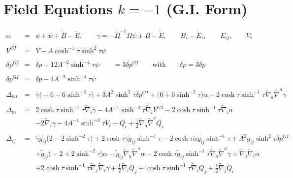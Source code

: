 \documentclass[10pt,letterpaper]{article}
\numberwithin{equation}{section}
\begin{document}
\section{Field Equations $k=-1$ (G.I. Form)}
\begin{eqnarray}
\alpha  &=& \phi + \psi + \dot B - \ddot E,\qquad \gamma = - \dot\Omega^{-1}\Omega \psi + B - \dot E,
\qquad B_i - \dot E_i,\qquad E_{ij},\qquad V_i
\\ \nonumber\\
V^{GI} &=& V -  A\cosh^{-1}\tau \sinh^2\tau \psi 
\\ \nonumber\\
\delta \rho^{GI}&=&\delta \rho - 12 A^{-2} \sinh^{-4}\tau \psi \qquad= 3\delta p^{GI}\qquad \text{with}\qquad \delta\rho=3\delta p
\\ \nonumber\\ 
\delta p^{GI}&=&\delta p  - 4 A^{-2}\sinh^{-4}\tau \psi 
\\ \nonumber\\
\Delta_{00}&=& \dot{\gamma} \bigl(-6 - 6 \sinh^{-2}\tau\bigr) + 3 A^2 \sinh^2\tau \delta p^{GI}{} + \bigl(6 + 6 \sinh^{-2}\tau\bigr) \alpha + 2 \cosh\tau \sinh^{-1}\tau \tilde{\nabla}_{a}\tilde{\nabla}^{a}\gamma 
\\  \nonumber\\ 
\Delta_{0i}&=& 2 \cosh\tau \sinh^{-1}\tau \tilde{\nabla}_{i}\dot{\gamma} - 4 A^{-1} \sinh^{-3}\tau \tilde{\nabla}_{i}V^{GI}{} - 2 \cosh\tau \sinh^{-1}\tau \tilde{\nabla}_{i}\alpha \nonumber \\ 
&& - 2 \tilde{\nabla}_{i}\gamma -4 A^{-1} \sinh^{-3}\tau V_{i} -  Q_{i} + \tfrac{1}{2} \tilde{\nabla}_{a}\tilde{\nabla}^{a}Q_{i}
\\  \nonumber\\ 
\Delta_{ij}&=& \dot{\gamma} \tilde{g}_{ij} \bigl(2 - 2 \sinh^{-2}\tau\bigr) + 2 \cosh\tau \overset{..}{\gamma} \tilde{g}_{ij} \sinh^{-1}\tau - 2 \cosh\tau \dot{\alpha} \tilde{g}_{ij} \sinh^{-1}\tau + A^2 \tilde{g}_{ij} \sinh^2\tau \delta p^{GI}{} \nonumber \\ 
&& + \tilde{g}_{ij} \bigl(-2 + 2 \sinh^{-2}\tau\bigr) \alpha -  \tilde{g}_{ij} \tilde{\nabla}_{a}\tilde{\nabla}^{a}\alpha - 2 \cosh\tau \tilde{g}_{ij} \sinh^{-1}\tau \tilde{\nabla}_{a}\tilde{\nabla}^{a}\gamma + \tilde{\nabla}_{j}\tilde{\nabla}_{i}\alpha \nonumber \\ 
&& + 2 \cosh\tau \sinh^{-1}\tau \tilde{\nabla}_{j}\tilde{\nabla}_{i}\gamma +\tfrac{1}{2} \tilde{\nabla}_{i}\dot{Q}_{j} + \cosh\tau \sinh^{-1}\tau \tilde{\nabla}_{i}Q_{j} + \tfrac{1}{2} \tilde{\nabla}_{j}\dot{Q}_{i} \nonumber \\ 

\end{eqnarray}
\end{document}

